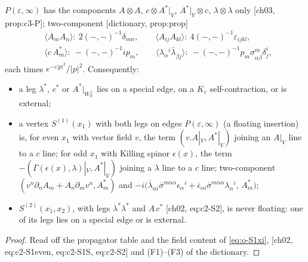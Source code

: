 \begin{lemma}
\label{lem:o-legs}
$P(\varepsilon,\infty)$ has the components $A\otimes A$, $c\otimes A^*|_V$, $A^*|_V\otimes c$, $\lambda\otimes\lambda$ only [ch03, prop:c3-P]; two-component [dictionary, prop:prop]
\[
\begin{aligned}
&\langle A_mA_n\rangle:\ 2(-,-)^{-1}\delta_{mn},\qquad \langle A_{ij}A_{kl}\rangle:\ 4(-,-)^{-1}\varepsilon_{ijkl},\\
&\langle c\,A^*_m\rangle:\ -(-,-)^{-1}ip_m,\qquad \langle\lambda_\alpha{}^i\bar\lambda_{\dot\beta j}\rangle:\ -(-,-)^{-1}p_m\sigma^m_{\alpha\dot\beta}\delta^i_j ,
\end{aligned}
\]
each times $e^{-\varepsilon|p|^2}/|p|^2$. Consequently:
\begin{itemize}
\item a leg $\lambda^*$, $c^*$ or $A^*|_{W_{\mathbb R}^\perp}$ lies on a special edge, on a $K_\varepsilon$ self-contraction, or is external;
\item a vertex $S^{(1)}(x_1)$ with both legs on edges $P(\varepsilon,\infty)$ (a floating insertion) is, for even $x_1$ with vector field $v$, the term $(v.A|_V,A^*|_V)$ joining an $A|_V$ line to a $c$ line; for odd $x_1$ with Killing spinor $\epsilon(x)$, the term $-(\Gamma(\epsilon(x),\lambda)|_V,A^*|_V)$ joining a $\lambda$ line to a $c$ line; two-component $(v^n\partial_nA_m+A_n\partial_mv^n,A^*_m)$ and $-i\big(\bar\lambda_{\dot\alpha i}\bar\sigma^{m\dot\alpha\alpha}\epsilon_\alpha{}^i+\bar\epsilon_{\dot\alpha i}\bar\sigma^{m\dot\alpha\alpha}\lambda_\alpha{}^i,\,A^*_m\big)$;
\item $S^{(2)}(x_1,x_2)$, with legs $\lambda^*\lambda^*$ and $A\,c^*$ [ch02, eq:c2-S2], is never floating: one of its legs lies on a special edge or is external.
\end{itemize}
\end{lemma}

\begin{proof}
Read off the propagator table and the field content of \eqref{eq:o-S1xi}, [ch02, eq:c2-S1even, eq:c2-S1S, eq:c2-S2] and (F1)--(F3) of the dictionary.
\end{proof}

